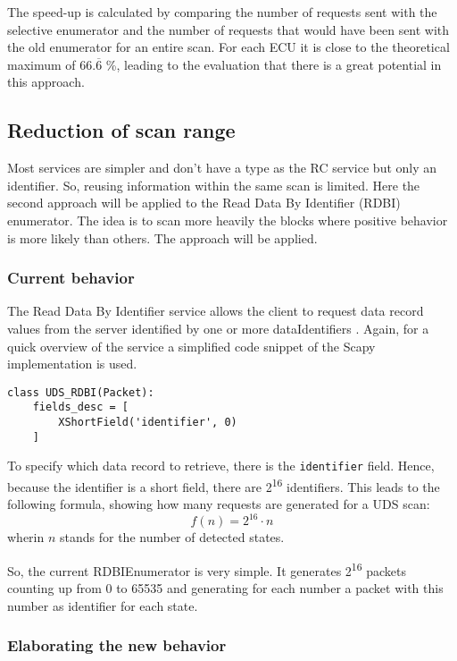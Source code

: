 The speed-up is calculated by comparing the number of requests sent with the selective enumerator and the number of requests that would have been sent with the old enumerator for an entire scan. For each ECU it is close to the theoretical maximum of $66.\overline{6}$ \%, leading to the evaluation that there is a great potential in this approach.


\subsection{Reduction of scan range}
Most services are simpler and don't have a type as the RC service but only an identifier. So, reusing information within the same scan is limited. Here the second approach will be applied to the Read Data By Identifier (RDBI) enumerator. The idea is to scan more heavily the blocks where positive behavior is more likely than others. The approach will be applied.

\subsubsection{Current behavior}

The Read Data By Identifier service allows the client to request data record values from the server identified by one or more dataIdentifiers \cite{iso14229}. Again, for a quick overview of the service a simplified code snippet of the Scapy implementation is used.

\begin{samepage}
\begin{verbatim}
class UDS_RDBI(Packet):
    fields_desc = [
        XShortField('identifier', 0)
    ]
\end{verbatim}
\end{samepage}

To specify which data record to retrieve, there is the \texttt{identifier} field. Hence, because the identifier is a short field, there are 2\textsuperscript{16} identifiers. This leads to the following formula, showing how many requests are generated for a UDS scan:
\[f(n)=2^{16} \cdot n\]
wherin $n$ stands for the number of detected states. 

So, the current RDBIEnumerator is very simple. It generates 2\textsuperscript{16} packets counting up from 0 to 65535 and generating for each number a packet with this number as identifier for each state.

\subsubsection{Elaborating the new behavior}

